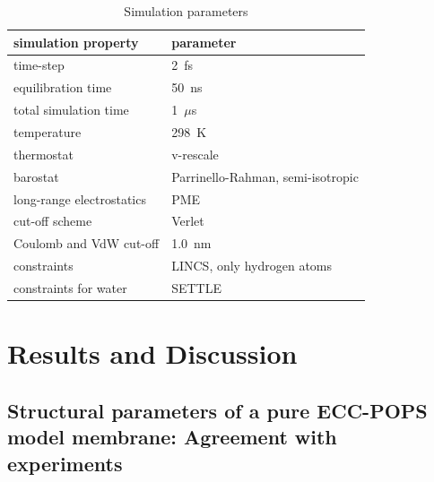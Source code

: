 \documentclass[journal=jpcbfk,manuscript=article]{achemso}
\begin{document}
\begin{table}[tbp]
  \caption{Simulation parameters}
  \label{tbl:mdpar}
  \begin{tabular}{ll}
    simulation property & parameter   \\
    \hline
    time-step           & 2~fs         \\
    equilibration time  & 50~ns  \\
    total simulation time     & 1~$\mu$s  \\
    temperature         & 298~K       \\
    thermostat          & v-rescale  \cite{bussi07}   \\
    barostat            & Parrinello-Rahman, semi-isotropic \cite{parrinello81} \\
    long-range electrostatics & PME  \cite{darden93}  \\
    cut-off scheme      & Verlet \cite{Pall13}      \\
    Coulomb and VdW cut-off & 1.0~nm \\
    constraints         & LINCS, only hydrogen atoms \cite{hess97} \\
    constraints for water & SETTLE  \cite{miyamoto92} \\
    \hline
  \end{tabular}
\end{table}
 



\section{Results and Discussion} 
 
\subsection{Structural parameters of a pure ECC-POPS model membrane: Agreement with experiments} 
 
\end{document}
